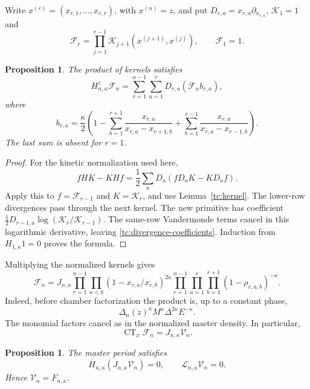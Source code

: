\documentclass[11pt]{amsart}
\newtheorem{proposition}[theorem]{Proposition}
\theoremstyle{definition}
\theoremstyle{remark}
\numberwithin{equation}{section}
\DeclareMathOperator{\CT}{CT}
\begin{document}
Write $x^{(r)}=(x_{r,1},\ldots,x_{r,r})$, with $x^{(n)}=z$,
and put $D_{r,a}=x_{r,a}\partial_{x_{r,a}}$,
$\mathscr K_1=1$ and
\[
 \mathscr F_r=\prod_{j=1}^{r-1}
       \mathscr K_{j+1}(x^{(j+1)},x^{(j)}),\qquad
 \mathscr F_1=1.
\]

\begin{proposition}\label{tc:divergence}
The product of kernels satisfies
\begin{equation}\label{tc:divergence-equation}
 H_{n,\kappa}^{z}\mathscr F_n
 =\sum_{r=1}^{n-1}\sum_{a=1}^r
       D_{r,a}(\mathscr F_n b_{r,a}),
\end{equation}
where
\begin{equation}\label{tc:divergence-coefficients}
 b_{r,a}=\frac\kappa2\left(
 1-\sum_{b=1}^{r+1}\frac{x_{r,a}}{x_{r,a}-x_{r+1,b}}
   +\sum_{b=1}^{r-1}\frac{x_{r,a}}{x_{r,a}-x_{r-1,b}}
 \right).
\end{equation}
The last sum is absent for $r=1$.
\end{proposition}

\begin{proof}
For the kinetic normalization used here,
\[
 fHK-KHf=\frac12\sum_aD_a(fD_aK-KD_af).
\]
Apply this to $f=\mathscr F_{r-1}$ and $K=\mathscr K_r$,
and use Lemma~\ref{tc:kernel}. The lower-row divergences
pass through the next kernel. The new primitive has coefficient
$\frac12D_{r-1,a}\log(\mathscr K_r/\mathscr K_{r-1})$.
The same-row Vandermonde terms cancel in this logarithmic
derivative, leaving \eqref{tc:divergence-coefficients}.
Induction from $H_{1,\kappa}1=0$ proves the formula.
\end{proof}

Multiplying the normalized kernels gives
\begin{equation}\label{tc:full-density}
 \mathscr F_n
 =J_{n,\kappa}
  \prod_{r=1}^{n-1}\prod_{a<b}
       (1-x_{r,a}/x_{r,b})^{2\kappa}
  \prod_{r=1}^{n-1}\prod_{a=1}^r\prod_{b=1}^{r+1}
       (1-\rho_{r,a,b})^{-\kappa}.
\end{equation}
Indeed, before chamber factorization the product is, up to a
constant phase,
\[
 \Delta_n(z)^\kappa M^\kappa\Delta^{2\kappa}E^{-\kappa}.
\]
The monomial factors cancel as in the normalized master density.
In particular,
\begin{equation}\label{tc:period-constant-term}
 \CT_x\mathscr F_n=J_{n,\kappa}\mathcal V_n.
\end{equation}

\begin{proposition}\label{tc:period-equation}\label{cg:period-equation}
The master period satisfies
\[
 H_{n,\kappa}(J_{n,\kappa}\mathcal V_n)=0,
 \qquad \mathcal L_{n,\kappa}\mathcal V_n=0.
\]
Hence $\mathcal V_n=F_{n,\kappa}$.
\end{proposition}
\end{document}
